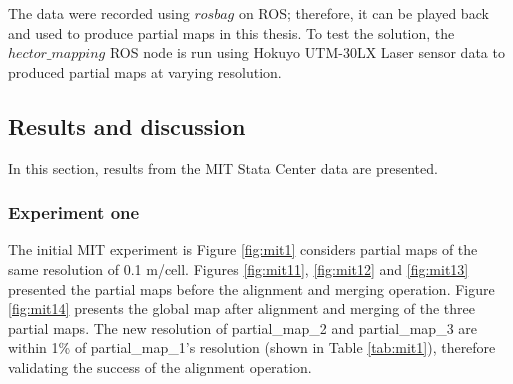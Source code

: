 The data were recorded using \(rosbag\) on ROS; therefore, it can be played back and used to produce partial maps in this thesis. To test the solution, the \(hector\_mapping\) ROS node is run using Hokuyo UTM-30LX Laser sensor data to produced partial maps at varying resolution.

\subsection{Results and discussion}

In this section, results from the MIT Stata Center data are presented.

\subsubsection{Experiment one} %


The initial MIT experiment is Figure \ref{fig:mit1} considers partial maps of the same resolution of 0.1 m/cell. Figures \ref{fig:mit11}, \ref{fig:mit12} and \ref{fig:mit13} presented the partial maps before the alignment and merging operation. Figure \ref{fig:mit14} presents the global map after alignment and merging of the three partial maps. The new resolution of partial\_map\_2 and partial\_map\_3 are within 1\% of partial\_map\_1's resolution (shown in Table \ref{tab:mit1}), therefore validating the success of the alignment operation.



